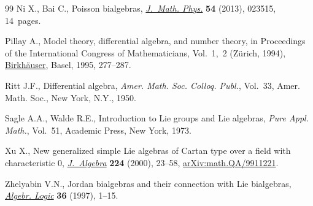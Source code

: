 \documentclass[10pt,a4paper]{amsart}
\numberwithin{equation}{section}
\begin{document}
\begin{thebibliography}{99}
Ni X., Bai C., Poisson bialgebras, \href{https://doi.org/10.1063/1.4792668}{\textit{J.~Math. Phys.}} \textbf{54} (2013),
 023515, 14~pages.

Pillay A., Model theory, differential algebra, and number theory, in
 Proceedings of the {I}nternational {C}ongress of {M}athematicians,
 {V}ol.~1,~2 ({Z}\"urich, 1994), \href{https://doi.org/10.1007/978-3-0348-9078-6_21}{Birkh\"auser}, Basel, 1995, 277--287.

Ritt J.F., Differential algebra, \textit{Amer. Math. Soc. Colloq. Publ.},
 Vol.~33, Amer. Math. Soc., New York, N.Y., 1950.

Sagle A.A., Walde R.E., Introduction to {L}ie groups and {L}ie algebras,
 \textit{Pure Appl. Math.}, Vol.~51, Academic Press, New York, 1973.

Xu X., New generalized simple {L}ie algebras of {C}artan type over a field with
 characteristic {$0$}, \href{https://doi.org/10.1006/jabr.1998.8083}{\textit{J.~Algebra}} \textbf{224} (2000), 23--58,
 \href{https://arxiv.org/abs/math.QA/9911221}{arXiv:math.QA/9911221}.

Zhelyabin V.N., Jordan bialgebras and their connection with {L}ie bialgebras,
 \href{https://doi.org/10.1007/BF02671949}{\textit{Algebr. Logic}} \textbf{36} (1997), 1--15.

\end{thebibliography}
\end{document}
